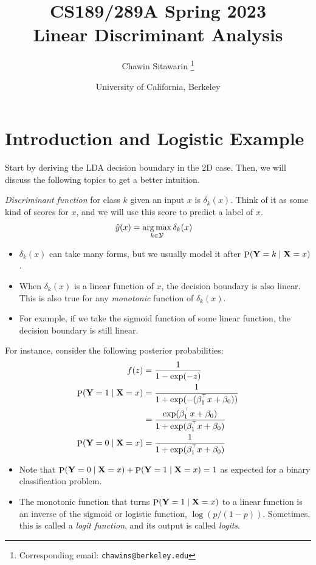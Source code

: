 \documentclass[letterpaper,12pt]{article}
\title{CS189/289A Spring 2023\\Linear Discriminant Analysis}
\author{
    Chawin Sitawarin \thanks{Corresponding email: \texttt{chawins@berkeley.edu}}
}
\date{
    University of California, Berkeley
}
\theoremstyle{plain}
\theoremstyle{definition}
\theoremstyle{remark}
\def\P{\mathop{\mathrm{P}}}
\begin{document}
\maketitle

\section{Introduction and Logistic Example}

Start by deriving the LDA decision boundary in the 2D case. Then, we will discuss the following topics to get a better intuition.

\emph{Discriminant function} for class $k$ given an input $x$ is $\delta_k(x)$.
Think of it as some kind of scores for $x$, and we will use this score to predict a label of $x$.
\begin{align}
    \hat{y}(x) & = \operatorname*{arg\,max}_{k \in \mathcal{Y}} \delta_k(x)
\end{align}

\begin{itemize}[leftmargin=*]
    \item $\delta_k(x)$ can take many forms, but we usually model it after $\P(\rmY = k \mid \rmX = x)$.
    \item When $\delta_k(x)$ is a linear function of $x$, the decision boundary is also linear. This is also true for any \emph{monotonic} function of $\delta_k(x)$.
    \item For example, if we take the sigmoid function of some linear function, the decision boundary is still linear.
\end{itemize}

For instance, consider the following posterior probabilities:
\begin{align}
    f(z)                       & = \frac{1}{1 - \exp(-z)}                                                \\
    \P(\rmY = 1 \mid \rmX = x) & = \frac{1}{1 + \exp(-(\beta_1^\T x + \beta_0))}                         \\
                               & = \frac{\exp(\beta_1^\T x + \beta_0)}{1 + \exp(\beta_1^\T x + \beta_0)} \\
    \P(\rmY = 0 \mid \rmX = x) & = \frac{1}{1 + \exp(\beta_1^\T x + \beta_0)}
\end{align}
\begin{itemize}[leftmargin=*]
    \item Note that $\P(\rmY = 0 \mid \rmX = x) + \P(\rmY = 1 \mid \rmX = x) = 1$ as expected for a binary classification problem.
    \item The monotonic function that turns $\P(\rmY = 1 \mid \rmX = x)$ to a linear function is an inverse of the sigmoid or logistic function, $\log(p/(1-p))$. Sometimes, this is called a \emph{logit function}, and its output is called \emph{logits}.
\end{itemize}
\end{document}
